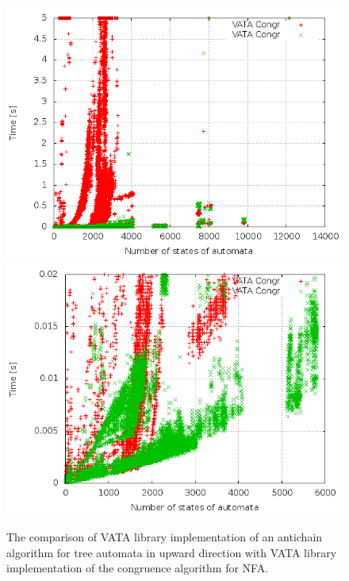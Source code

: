 \begin{figure}[bt]
\begin{center}
\includegraphics[scale=0.3]{fig/plot_ac_zprava.png}
\includegraphics[scale=0.3]{fig/plot_ac_step_zprava.png}
\label{figPlotAc}
\caption{The comparison of VATA library implementation of an antichain algorithm for tree automata in upward direction
    with VATA library implementation of the congruence algorithm for NFA.}
\end{center}
\end{figure}

